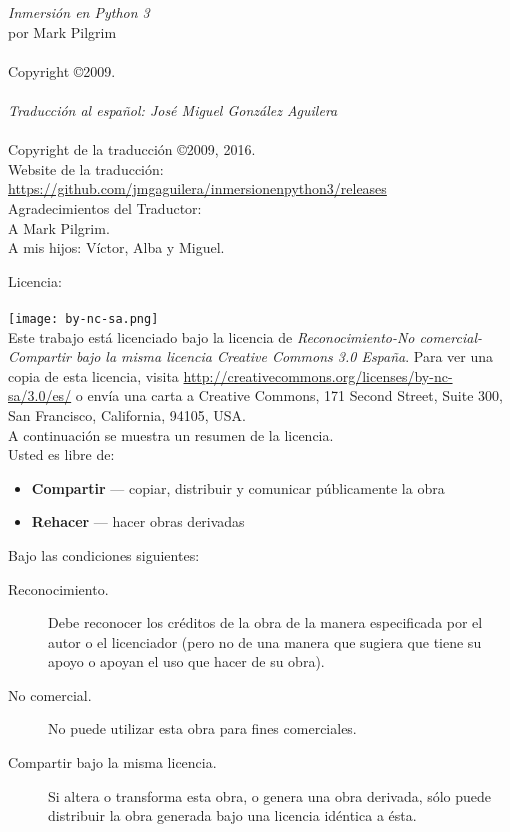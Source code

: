 \pagestyle{empty}
\frontmatter
\noindent
\textsf{\emph{Inmersión en Python 3}}\\
por Mark Pilgrim\\
\\
Copyright \copyright 2009.\\
\\
\textsf{\emph{Traducción al español: José Miguel González Aguilera}}\\
\\
Copyright de la traducción \copyright 2009, 2016.\\
Website de la traducción: \href{https://github.com/jmgaguilera/inmersionenpython3/releases}{https://github.com/jmgaguilera/inmersionenpython3/releases}\\
\linebreak 
\noindent
Agradecimientos del Traductor:\\
A Mark Pilgrim.\\
A mis hijos: Víctor, Alba y Miguel.

\noindent
Licencia:\\
\\
\texttt{[image: by-nc-sa.png]}\\
Este trabajo está licenciado bajo la licencia de \emph{Reconocimiento-No comercial-Compartir bajo la misma licencia Creative Commons 3.0 España}. Para ver una copia de esta licencia, visita \href{http://creativecommons.org/licenses/by-nc-sa/3.0/es/}{http://creativecommons.org/licenses/by-nc-sa/3.0/es/} o envía una carta a Creative Commons, 171 Second Street, Suite 300, San Francisco, California, 94105, USA.\\

\noindent
A continuación se muestra un resumen de la licencia.\\

\noindent
Usted es libre de:
\begin{itemize}
 \item \textbf{Compartir} — copiar, distribuir y comunicar públicamente la obra 
 \item \textbf{Rehacer} — hacer obras derivadas
\end{itemize}
\noindent
Bajo las condiciones siguientes:
\begin{description}
 \item[Reconocimiento.] Debe reconocer los créditos de la obra de la manera especificada por el autor o el licenciador (pero no de una manera que sugiera que tiene su apoyo o apoyan el uso que hacer de su obra).
 \item[No comercial.] No puede utilizar esta obra para fines comerciales.
 \item[Compartir bajo la misma licencia.] Si altera o transforma esta obra, o genera una obra derivada, sólo puede distribuir la obra generada bajo una licencia idéntica a ésta. 
\end{description}

